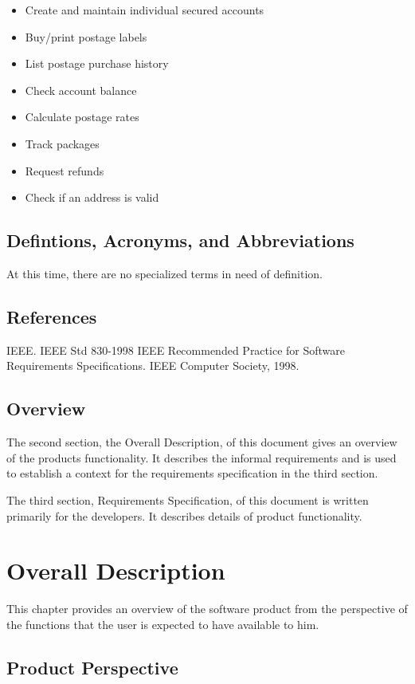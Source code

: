 \documentclass{scrreprt}
\begin{document}
\begin{itemize}
\item Create and maintain individual secured accounts
\item Buy/print postage labels
\item List postage purchase history
\item Check account balance
\item Calculate postage rates
\item Track packages
\item Request refunds
\item Check if an address is valid
\end{itemize}

\section{Defintions, Acronyms, and Abbreviations}

At this time, there are no specialized terms in need of definition.

\section{References}

IEEE. IEEE Std 830-1998 IEEE Recommended Practice for Software Requirements
Specifications. IEEE Computer Society, 1998.

\section{Overview}

The second section, the Overall Description, of this document gives an overview
of the products functionality. It describes the informal requirements and is
used to establish a context for the requirements specification in the third
section.

The third section, Requirements Specification, of this document is written
primarily for the developers. It describes details of product functionality. 

\chapter{Overall Description}

This chapter provides an overview of the software product from the perspective 
of the functions that the user is expected to have available to him.

\section{Product Perspective}
\end{document}
